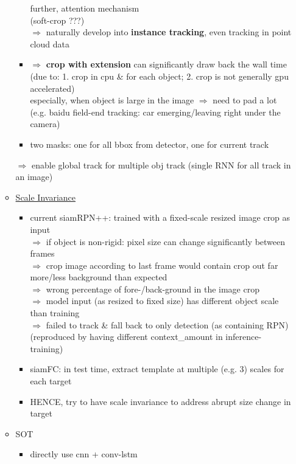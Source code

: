 \begin{itemize}
\begin{itemize}
\begin{itemize}
		further, attention mechanism \\
		(soft-crop ???) \\
		$\Rightarrow$ naturally develop into \textbf{instance tracking}, even tracking in point cloud data
		\item $\Rightarrow$ \textbf{crop with extension} can significantly draw back the wall time \\
		(due to: 1. crop in cpu \& for each object; 2. crop is not generally gpu accelerated) \\
		especially, when object is large in the image $\Rightarrow$ need to pad a lot \\
		(e.g. baidu field-end tracking: car emerging/leaving right under the camera)
		\item two masks: one for all bbox from detector, one for current track
		\end{itemize}
		$\Rightarrow$ enable global track for multiple obj track (single RNN for all track in an image)
	\item \underline{Scale Invariance}
		\begin{itemize}
		\item current siamRPN++: trained with a fixed-scale resized image crop as input \\
		$\Rightarrow$ if object is non-rigid: pixel size can change significantly between frames \\
		$\Rightarrow$ crop image according to last frame would contain crop out far more/less background than expected \\
		$\Rightarrow$ wrong percentage of fore-/back-ground in the image crop \\
		$\Rightarrow$ model input (as resized to fixed size) has different object scale than training \\
		$\Rightarrow$ failed to track \& fall back to only detection (as containing RPN) \\
		(reproduced by having different context\_amount in inference-training)
		\item siamFC: in test time, extract template at multiple (e.g. 3) scales for each target
		\item HENCE, try to have scale invariance to address abrupt size change in target
		\end{itemize}
	\item SOT
		\begin{itemize}
		\item directly use cnn + conv-lstm
		\end{itemize}

\end{itemize}
\end{itemize}
